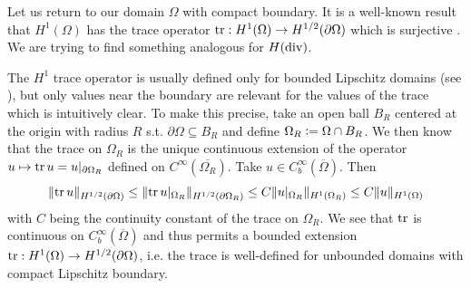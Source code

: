 \documentclass[../master_thesis.tex]{subfiles}
\begin{document}
Let us return to our domain $\Omega$ with compact boundary. It 
is a well-known result that $H^1(\Omega)$ has the trace operator 
$\operatorname{tr}: H^1(\Omega) \rightarrow H^{1/2}(\partial \Omega)$ which is surjective \cite[p.28]{arnold}.
We are trying to find something analogous for $H(\operatorname{div})$.

\begin{remark}
    The $H^1$ trace operator is usually defined only for bounded Lipschitz domains 
    (see \cite[Thm.\,3.9]{monk}), but only values near the boundary are relevant for the 
    values of the trace which is intuitively clear. 
    To make this precise, take an open ball $B_R$ centered at the origin with radius $R$ 
    s.t. $\partial \Omega \subseteq B_R$ and define $\Omega_R \vcentcolon= \Omega \cap B_R$.
    We then know that the trace on $\Omega_R$ is the 
    unique continuous extension of the operator $u \mapsto \operatorname{tr} u = u|_{\partial \Omega_R}$ 
    defined on $C^\infty(\overline{\Omega_R})$. Take 
    $u \in C^\infty_b(\overline{\Omega})$. Then 
    \begin{align*}
        \lVert \operatorname{tr} u \rVert _{H^{1/2}(\partial \Omega)} 
        \leq \lVert \operatorname{tr} u|_{\Omega_R} \rVert _{H^{1/2}(\partial \Omega_R)}
        \leq C \lVert u|_{\Omega_R} \rVert _{H^1(\Omega_R)}
        \leq C \lVert u \rVert _{H^1(\Omega)}
    \end{align*}
    with $C$ being the continuity constant of the trace on $\Omega_R$. 
    We see that $\operatorname{tr}$ is continuous on $C^\infty_b (\overline{\Omega})$ and thus permits 
    a bounded extension $\operatorname{tr}: H^1(\Omega) \rightarrow H^{1/2}(\partial \Omega)$,
    i.e. the trace is well-defined for unbounded domains with compact Lipschitz boundary.

\end{remark}
\end{document}
